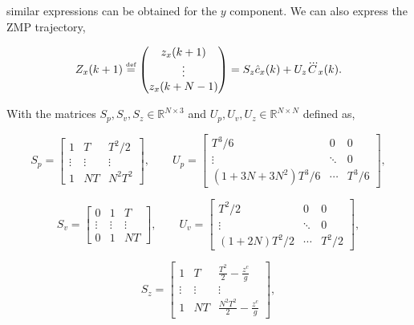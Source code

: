 \noindent similar expressions can be obtained for the $y$ component. We can also express the ZMP trajectory,

\begin{equation}
 \label{Eq:PosZMPHorizon}
 { Z}_x(k+1) \stackrel{\mbox{\tiny def}}{=}  \left(
 \begin{matrix}
  {z}_x(k+1) \\
  \vdots \\
  {z}_x(k+N-1)
 \end{matrix}
 \right) = { S}_z \hat{c}_x(k) + { U}_z \dddot{ C}_x(k).
\end{equation} 

With the matrices $S_p, S_v, S_z \in \mathbb{R}^{N\times3}$ and $U_p, U_v , U_z \in \mathbb{R}^{N \times N}$ defined as,

\begin{equation*}
  S_{p}=\begin{bmatrix} 1 & T & T^2/2 \\ \vdots & \vdots & \vdots \\ 1 & NT & N^2T^2 \end{bmatrix}, \qquad
  U_{p}=\begin{bmatrix} T^3/6 & 0 & 0 \\ \vdots & \ddots & 0 \\ (1+3N+3N^2)T^3/6 & \cdots & T^3/6 \end{bmatrix},
\end{equation*}

\begin{equation*}
  S_{v}=\begin{bmatrix} 0 & 1 & T \\ \vdots & \vdots & \vdots \\ 0 & 1 & NT \end{bmatrix}, \qquad
  U_{v}=\begin{bmatrix} T^2/2 & 0 & 0 \\ \vdots & \ddots & 0 \\ (1+2N)T^2/2 & \cdots & T^2/2 \end{bmatrix},
\end{equation*}

\begin{equation*}
  S_{z} = \begin{bmatrix} 1 & T & \frac{T^2}2-\frac{z^{c}}{g} \\ \vdots & \vdots & \vdots \\
                          1 & NT & \frac{N^2T^2}{2}-\frac{z^{c}}{g} \end{bmatrix},
\end{equation*}

